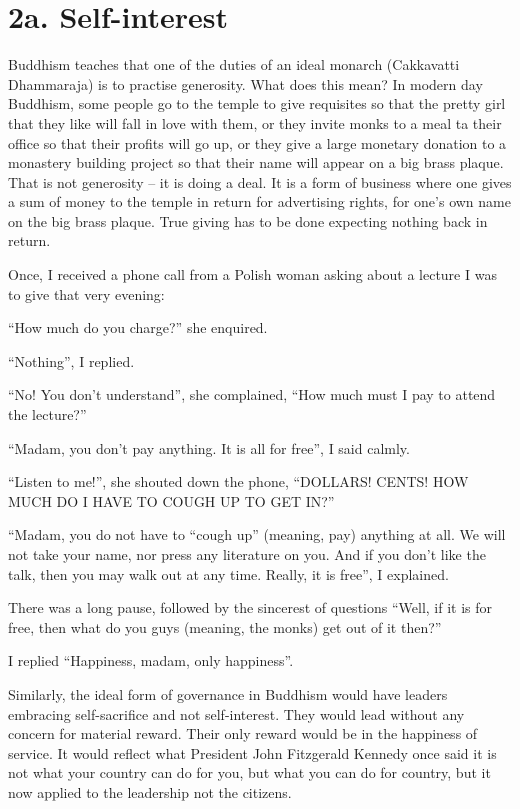 \documentclass[12pt, openany]{book}
\begin{document}
\section{2a. Self-interest}

Buddhism teaches that one of the duties of an ideal monarch (Cakkavatti Dhammaraja) is to practise generosity. What does this mean? In modern day Buddhism, some people go to the temple to give requisites so that the pretty girl that they like will fall in love with them, or they invite monks to a meal ta their office so that their profits will go up, or they give a large monetary donation to a monastery building project so that their name will appear on a big brass plaque. That is not generosity – it is doing a deal. It is a form of business where one gives a sum of money to the temple in return for advertising rights, for one’s own name on the big brass plaque. True giving has to be done expecting nothing back in return.

Once, I received a phone call from a Polish woman asking about a lecture I was to give that very evening:

“How much do you charge?” she enquired.

“Nothing”, I replied.

“No! You don’t understand”, she complained, “How much must I pay to attend the lecture?”

“Madam, you don’t pay anything. It is all for free”, I said calmly.

“Listen to me!”, she shouted down the phone, “DOLLARS! CENTS! HOW MUCH DO I HAVE TO COUGH UP TO GET IN?”

“Madam, you do not have to “cough up” (meaning, pay) anything at all. We will not take your name, nor press any literature on you. And if you don’t like the talk, then you may walk out at any time. Really, it is free”, I explained.

There was a long pause, followed by the sincerest of questions “Well, if it is for free, then what do you guys (meaning, the monks) get out of it then?”

I replied “Happiness, madam, only happiness”.

Similarly, the ideal form of governance in Buddhism would have leaders embracing self-sacrifice and not self-interest. They would lead without any concern for material reward. Their only reward would be in the happiness of service. It would reflect what President John Fitzgerald Kennedy once said it is not what your country can do for you, but what you can do for country, but it now applied to the leadership not the citizens.
\end{document}
